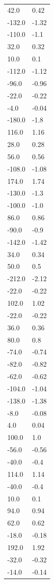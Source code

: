 \begin{longtable}{ll}
42.0 & 0.42 \\
-132.0 & -1.32 \\
-110.0 & -1.1 \\
32.0 & 0.32 \\
10.0 & 0.1 \\
-112.0 & -1.12 \\
-96.0 & -0.96 \\
-22.0 & -0.22 \\
-4.0 & -0.04 \\
-180.0 & -1.8 \\
116.0 & 1.16 \\
28.0 & 0.28 \\
56.0 & 0.56 \\
-108.0 & -1.08 \\
174.0 & 1.74 \\
-130.0 & -1.3 \\
-100.0 & -1.0 \\
86.0 & 0.86 \\
-90.0 & -0.9 \\
-142.0 & -1.42 \\
34.0 & 0.34 \\
50.0 & 0.5 \\
-212.0 & -2.12 \\
-22.0 & -0.22 \\
102.0 & 1.02 \\
-22.0 & -0.22 \\
36.0 & 0.36 \\
80.0 & 0.8 \\
-74.0 & -0.74 \\
-82.0 & -0.82 \\
-62.0 & -0.62 \\
-104.0 & -1.04 \\
-138.0 & -1.38 \\
-8.0 & -0.08 \\
4.0 & 0.04 \\
100.0 & 1.0 \\
-56.0 & -0.56 \\
-40.0 & -0.4 \\
114.0 & 1.14 \\
-40.0 & -0.4 \\
10.0 & 0.1 \\
94.0 & 0.94 \\
62.0 & 0.62 \\
-18.0 & -0.18 \\
192.0 & 1.92 \\
-32.0 & -0.32 \\
-14.0 & -0.14 \\

\end{longtable}
